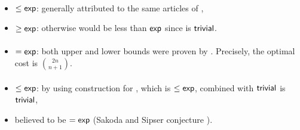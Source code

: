 \paragraph{\TNFA{}\tto\ODFA}\label{cost:2NFAto1DFA}
\begin{itemize}
	\item $\le\mathsf{exp}$: generally attributed to the same articles of \hyperref[cost:2DFAto1DFA]{\TDFA{}\tto\ODFA},
	\item $\ge\mathsf{exp}$: otherwise \hyperref[cost:1NFAto1DFA]{\ONFA{}\tto\ODFA} would be less than $\mathsf{exp}$ since \ONFA{}\tto\TNFA is $\mathsf{trivial}$.
\end{itemize}
\paragraph{\TNFA{}\tto\ONFA}
\begin{itemize}
	\item $=\mathsf{exp}$: both upper and lower bounds were proven by . Precisely, the optimal cost is $\binom{2n}{n+1}$.
\end{itemize}
\paragraph{\TNFA{}\tto\TDFA}
\begin{itemize}
	\item $\le\mathsf{exp}$: by using construction for \hyperref[cost:2NFAto1DFA]{\TNFA{}\tto\ODFA}, which is $\le\mathsf{exp}$, combined with $\mathsf{trivial}$ \ODFA{}\tto\TDFA is $\mathsf{trivial}$,
	\item believed to be $=\mathsf{exp}$ (Sakoda and Sipser conjecture \cite{SakSip78}).
\end{itemize}


